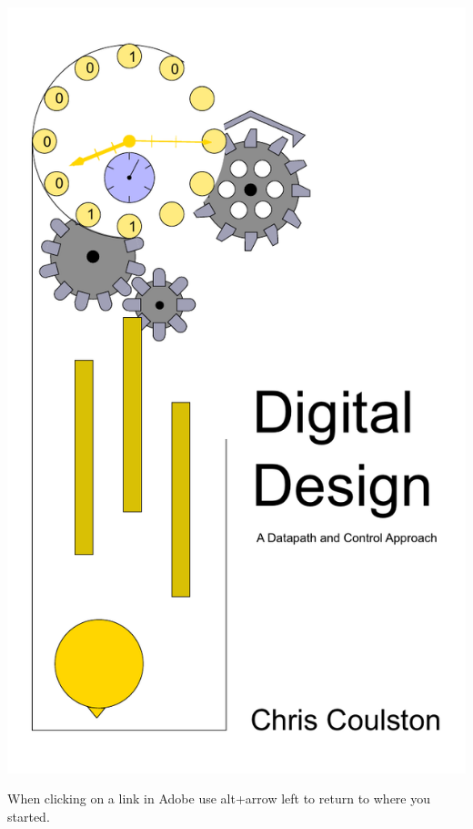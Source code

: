 \documentclass[letterpaper, 10pt]{memoir}
\begin{document}


\frontmatter
 \title{}
\includegraphics{./Fig/colorCover}
 \maketitle
 
 
 
\tableofcontents
\vspace{0.4cm}
When clicking on a link in Adobe use alt+arrow left to return to where you started.
\mainmatter
\end{document}
